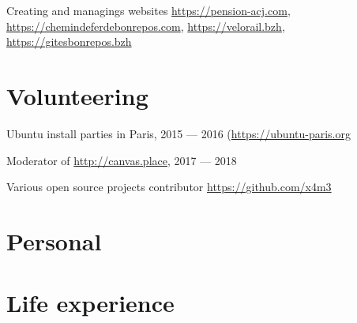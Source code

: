 \documentclass[a4paper]{article}
\begin{document}
Creating and managings websites \url{https://pension-acj.com}, \url{https://chemindeferdebonrepos.com}, \url{https://velorail.bzh}, \url{https://gitesbonrepos.bzh}

\section*{Volunteering}

Ubuntu install parties in Paris, 2015 — 2016 (\url{https://ubuntu-paris.org}

Moderator of \url{http://canvas.place}, 2017 — 2018

Various open source projects contributor \url{https://github.com/x4m3}

\section*{Personal}
\section*{Life experience}
\end{document}
